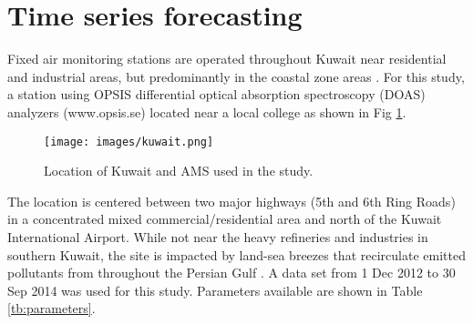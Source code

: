 \clearpage

\section{Time series forecasting}

Fixed air monitoring stations are operated throughout Kuwait near residential and industrial areas, but predominantly in the coastal zone areas \citep{Freeman2017a}. For this study, a station using OPSIS differential optical absorption spectroscopy (DOAS) analyzers (www.opsis.se) located near a local college as shown in Fig \ref{fig:Kuwait}. 
%
\begin{figure}[H]
\centering
\texttt{[image: images/kuwait.png]}
\caption{Location of Kuwait and AMS used in the study.}
\label{fig:Kuwait}
\end{figure}
%
The location is centered between two major highways (5th and 6th Ring Roads) in a concentrated mixed commercial/residential area and north of the Kuwait International Airport. While not near the heavy refineries and industries in southern Kuwait, the site is impacted by land-sea breezes that recirculate emitted pollutants from throughout the Persian Gulf \citep{Freeman2017}. A data set from 1 Dec 2012 to 30 Sep 2014 was used for this study. Parameters available are shown in Table \ref{tb:parameters}.
%


